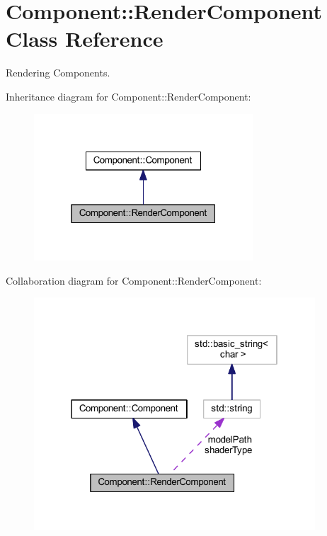 \hypertarget{class_component_1_1_render_component}{}\section{Component\+:\+:Render\+Component Class Reference}
\label{class_component_1_1_render_component}


Rendering Components.  




Inheritance diagram for Component\+:\+:Render\+Component\+:
\nopagebreak
\begin{figure}[H]
\begin{center}
\leavevmode
\includegraphics[width=232pt]{class_component_1_1_render_component__inherit__graph}
\end{center}
\end{figure}


Collaboration diagram for Component\+:\+:Render\+Component\+:
\nopagebreak
\begin{figure}[H]
\begin{center}
\leavevmode
\includegraphics[width=298pt]{class_component_1_1_render_component__coll__graph}
\end{center}
\end{figure}
